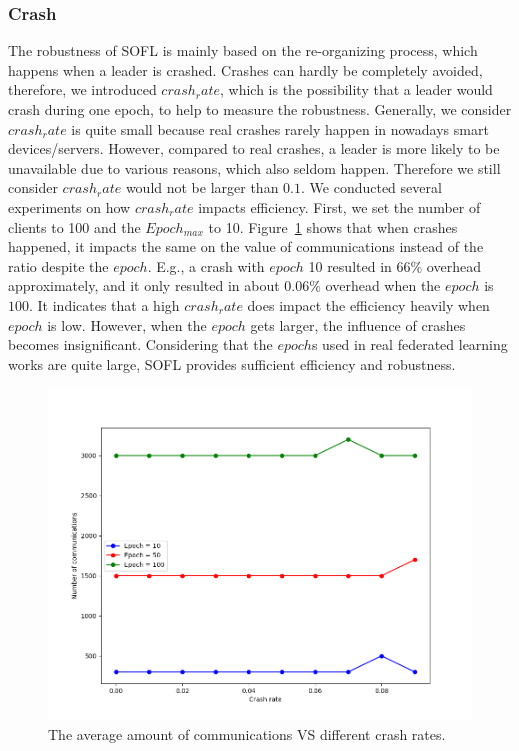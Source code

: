 \subsubsection{Crash}
The robustness of SOFL is mainly based on the re-organizing process, which happens when a leader is crashed. Crashes can hardly be completely avoided, therefore, we introduced $crash_rate$, which is the possibility that a leader would crash during one epoch, to help to measure the robustness. Generally, we consider $crash_rate$ is quite small because real crashes rarely happen in nowadays smart devices/servers. However, compared to real crashes, a leader is more likely to be unavailable due to various reasons, which also seldom happen. Therefore we still consider $crash_rate$ would not be larger than $0.1$. We conducted several experiments on how $crash_rate$ impacts efficiency. First, we set the number of clients to 100 and the $Epoch_{max}$ to 10. Figure~\ref{comm-crash} shows that when crashes happened, it impacts the same on the value of communications instead of the ratio despite the $epoch$. E.g., a crash with $epoch$ 10 resulted in $66\%$ overhead approximately, and it only resulted in about $0.06\%$ overhead when the $epoch$ is $100$. It indicates that a high $crash_rate$ does impact the efficiency heavily when $epoch$ is low. However, when the $epoch$ gets larger, the influence of crashes becomes insignificant. Considering that the $epoch$s used in real federated learning works are quite large, SOFL provides sufficient efficiency and robustness.

\begin{figure}[!ht]
    \centering
    \includegraphics[width=\columnwidth]{img/comm-crash.png}
    \caption{The average amount of communications VS different crash rates.}
    \label{comm-crash}
\end{figure}

